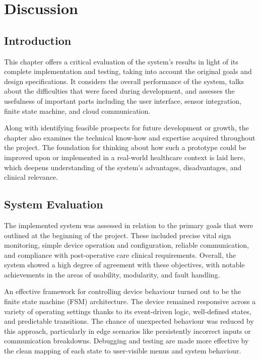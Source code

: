 \chapter{Discussion}

\section{Introduction}
This chapter offers a critical evaluation of the system's results in light of its complete implementation and testing, taking into account the original goals and design specifications. It considers the overall performance of the system, talks about the difficulties that were faced during development, and assesses the usefulness of important parts including the user interface, sensor integration, finite state machine, and cloud communication.

Along with identifying feasible prospects for future development or growth, the chapter also examines the technical know-how and expertise acquired throughout the project. The foundation for thinking about how such a prototype could be improved upon or implemented in a real-world healthcare context is laid here, which deepens understanding of the system's advantages, disadvantages, and clinical relevance.

\section{System Evaluation}
The implemented system was assessed in relation to the primary goals that were outlined at the beginning of the project. These included precise vital sign monitoring, simple device operation and configuration, reliable communication, and compliance with post-operative care clinical requirements. Overall, the system showed a high degree of agreement with these objectives, with notable achievements in the areas of usability, modularity, and fault handling.

An effective framework for controlling device behaviour turned out to be the finite state machine (FSM) architecture. The device remained responsive across a variety of operating settings thanks to its event-driven logic, well-defined states, and predictable transitions. The chance of unexpected behaviour was reduced by this approach, particularly in edge scenarios like persistently incorrect inputs or communication breakdowns. Debugging and testing are made more effective by the clean mapping of each state to user-visible menus and system behaviour.

